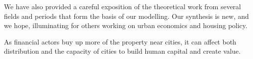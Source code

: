 We have also provided a careful exposition of the theoretical work from several fields and periods that form the basis of our modelling. Our synthesis is new, and we hope, illuminating for others working on urban economics and housing policy.


As financial actors buy up more of the property near cities, it can affect both distribution and the capacity of cities to build human capital and create value. 













